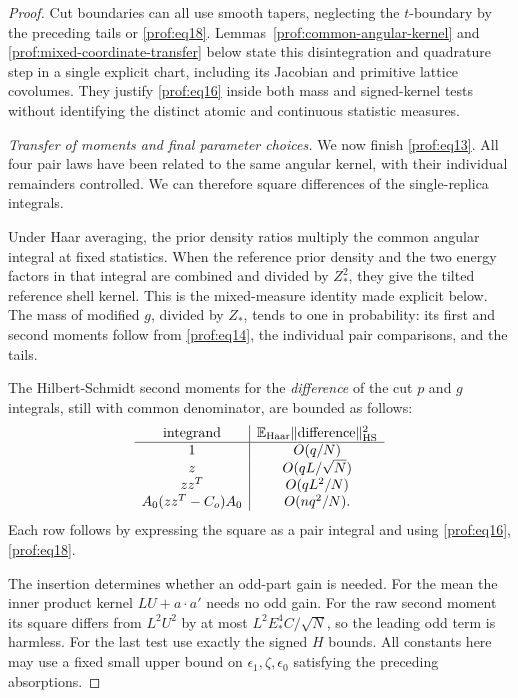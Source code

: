 \begin{proof}
Cut boundaries can all use smooth tapers, neglecting the \(t\)-boundary by the preceding tails or \eqref{prof:eq18}. Lemmas~\ref{prof:common-angular-kernel} and
\ref{prof:mixed-coordinate-transfer} below state this disintegration and
quadrature step in a single explicit chart, including its Jacobian and
primitive lattice covolumes. They justify \eqref{prof:eq16} inside both
mass and signed-kernel tests without identifying the distinct atomic
and continuous statistic measures.

\par\smallskip\noindent\textit{Transfer of moments and final parameter choices.}\enspace
We now finish \eqref{prof:eq13}. All four pair laws have been related
to the same angular kernel, with their individual remainders controlled.
We can therefore square differences of the single-replica integrals.

Under Haar averaging, the prior density ratios multiply the common
angular integral at fixed statistics. When the reference prior
density and the two energy factors in that integral are combined
and divided by \(Z_*^2\), they give the tilted reference shell
kernel. This is the mixed-measure identity made explicit below.
The mass of modified \(g\), divided by \(Z_*\), tends to one in
probability: its first and second moments follow from
\eqref{prof:eq14}, the individual pair comparisons, and the tails.

The Hilbert-Schmidt second moments for the \emph{difference} of the cut \(p\) and \(g\) integrals, still with common denominator, are bounded as follows:
\begin{equation}\label{prof:eq19}
\begin{array}{c|c}
 {\rm integrand} & \mathbb E_{\rm Haar}\|\text{difference}\|_{\rm HS}^2\\ \hline
 1 & O(q/N)\\
 z & O(q L/\sqrt N)\\
 zz^T & O(q L^2/N)\\
 A_0(zz^T-C_o)A_0 & O(n q^2/N).
 \end{array}
\end{equation}
Each row follows by expressing the square as a pair integral and using
\eqref{prof:eq16}, \eqref{prof:eq18}.

The insertion determines whether
an odd-part gain is needed. For the mean the inner product kernel \(L U+a\cdot a'\) needs no odd gain. For the raw second moment its square differs from \(L^2U^2\) by at most \(L^2 E_*^4 C/\sqrt N\), so the leading odd term is harmless. For the last test use exactly the signed \(H\) bounds. All constants here may use a fixed small upper bound on \(\epsilon_1,\zeta,\epsilon_0\) satisfying the preceding absorptions.


\end{proof}
